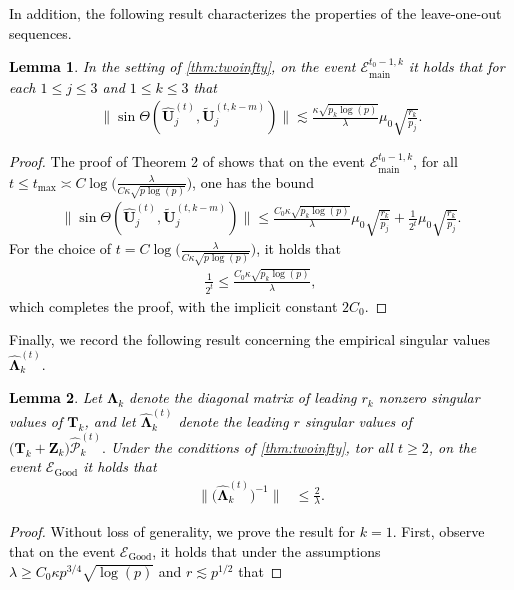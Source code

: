 \documentclass[10pt]{article}
\newcommand{\0}{{\mathbf{0}}}
\newcommand{\1}{{\mathbf{1}}}
\renewcommand{\citet}{\cite}
\newcommand{\utilde}{\mathbf{\tilde{U}}}
\newcommand{\uhat}{\mathbf{\hat{U}}}
\newtheorem{lemma}{Lemma}
\newcommand{\inv}{^{-1}}
\renewcommand{\tilde}{\widetilde}
\renewcommand{\hat}{\widehat}
\renewcommand{\hat}{\widehat}
\begin{document}
\textcolor{black}{
 In addition, the following result characterizes the properties of the leave-one-out sequences.
\begin{lemma} \label{sinthetaloo14}
In the setting of \cref{thm:twoinfty}, on the event $\mathcal{E}_{\mathrm{main}}^{t_0-1,k}$ it holds that for each $1 \leq j \leq 3$ and $1 \leq k \leq 3$ that
\begin{align*}
    \| \sin\Theta(\uhat_j^{(t)},\utilde_j^{(t,k-m)}) \| \lesssim \frac{\kappa \sqrt{p_k \log(p)}}{\lambda} \mu_0 \sqrt{\frac{r_k}{p_j}}.
\end{align*}
\end{lemma}
\begin{proof}
The proof of Theorem 2 of \citet{agterberg_estimating_2022} shows that on the event $\mathcal{E}_{\mathrm{main}}^{t_0-1,k}$, for all $t \leq t_{\max} \asymp  C \log \bigg( \frac{\lambda}{C \kappa \sqrt{p\log(p)}} \bigg)$, one has the bound
\begin{align*}
    \| \sin\Theta(\uhat_j^{(t)}, \utilde_j^{(t,k-m)}) \| \leq \frac{C_0 \kappa \sqrt{p_k\log(p)}}{\lambda} \mu_0 \sqrt{\frac{r_k}{p_j}} + \frac{1}{2^t} \mu_0 \sqrt{\frac{r_k}{p_j}}.
\end{align*}
For the choice of $t = C \log \bigg( \frac{\lambda}{C \kappa \sqrt{p\log(p)}} \bigg)$, it holds that
\begin{align*}
    \frac{1}{2^t} \leq \frac{C_0 \kappa \sqrt{p_k\log(p)}}{\lambda},
\end{align*}
which completes the proof, with the implicit constant $2 C_0$.  
\end{proof}  
Finally, we record the following result concerning the empirical singular values $\mathbf{\hat \Lambda}_k^{(t)}$.
\begin{lemma}\label{lem:eigengaps}
Let $\mathbf{\Lambda}_k$ denote the diagonal matrix of leading $r_k$ nonzero singular values of $\mathbf{T}_k$, and let $\mathbf{\hat \Lambda}_k^{(t)}$ denote the leading $r$ singular values of $(\mathbf{T}_k + \mathbf{Z}_k\big) \mathcal{\hat P}_k^{(t)}.$ Under the conditions of \cref{thm:twoinfty}, tor all $t \geq 2$, on the event $\mathcal{E}_{{\mathrm{Good}}}$ it holds that
\begin{align*}
    \| \big(\mathbf{\hat \Lambda}_k^{(t)} \big)\inv \| &\leq  \frac{2}{\lambda}.
\end{align*}
\end{lemma}
\begin{proof}
Without loss of generality, we prove the result for $k = 1$.  First, observe that on the event $\mathcal{E}_{\mathrm{Good}}$, it holds that under the assumptions $\lambda \geq C_0 \kappa p^{3/4} \sqrt{\log(p)}$ and $r \lesssim p^{1/2}$ that

\end{proof}}
\end{document}
